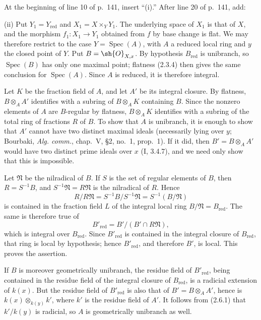At the beginning of line 10 of p.~141, insert ``(i).''  After line 20
of p.~141, add:

\smallskip
\noindent
\textup{(ii)} Put $Y_1=Y_{\mathrm{red}}$ and
$X_1=X\times_Y Y_1$.  The underlying space of $X_1$ is that of $X$,
and the morphism $f_1:X_1\to Y_1$ obtained from $f$ by base change is
flat.  We may therefore restrict to the case
$Y=\operatorname{Spec}(A)$, with $A$ a reduced local ring and $y$ the
closed point of $Y$.  Put $B=\sh{O}_{X,x}$.  By hypothesis
$B_{\mathrm{red}}$ is unibranch, so $\operatorname{Spec}(B)$ has only
one maximal point; flatness (2.3.4) then gives the same conclusion for
$\operatorname{Spec}(A)$.  Since $A$ is reduced, it is therefore
integral.

Let $K$ be the fraction field of $A$, and let $A'$ be its integral
closure.  By flatness, $B\otimes_A A'$ identifies with a subring of
$B\otimes_A K$ containing $B$.  Since the nonzero elements of $A$ are
$B$-regular by flatness, $B\otimes_A K$ identifies with a subring of the
total ring of fractions $R$ of $B$.  To show that $A$ is unibranch, it
is enough to show that $A'$ cannot have two distinct maximal ideals
(necessarily lying over $y$; Bourbaki, \emph{Alg. comm.}, chap.~V,
\S2, no.~1, prop.~1).  If it did, then
$B'=B\otimes_A A'$ would have two distinct prime ideals over $x$
(I, 3.4.7), and we need only show that this is impossible.

Let $\mathfrak N$ be the nilradical of $B$.  If $S$ is the set of
regular elements of $B$, then $R=S^{-1}B$, and
$S^{-1}\mathfrak N=R\mathfrak N$ is the nilradical of $R$.  Hence
\[
 R/R\mathfrak N=S^{-1}B/S^{-1}\mathfrak N
 =S^{-1}(B/\mathfrak N)
\]
is contained in the fraction field $L$ of the integral local ring
$B/\mathfrak N=B_{\mathrm{red}}$.  The same is therefore true of
\[
 B'_{\mathrm{red}}=B'/(B'\cap R\mathfrak N),
\]
which is integral over $B_{\mathrm{red}}$.  Since
$B'_{\mathrm{red}}$ is contained in the integral closure of
$B_{\mathrm{red}}$, that ring is local by hypothesis; hence
$B'_{\mathrm{red}}$, and therefore $B'$, is local.  This proves the
assertion.

If $B$ is moreover geometrically unibranch, the residue field of
$B'_{\mathrm{red}}$, being contained in the residue field of the
integral closure of $B_{\mathrm{red}}$, is a radicial extension of
$k(x)$.  But the residue field of $B'_{\mathrm{red}}$ is also that of
$B'=B\otimes_A A'$, hence is
$k(x)\otimes_{k(y)}k'$, where $k'$ is the residue field of $A'$.  It
follows from (2.6.1) that $k'/k(y)$ is radicial, so $A$ is geometrically
unibranch as well.

